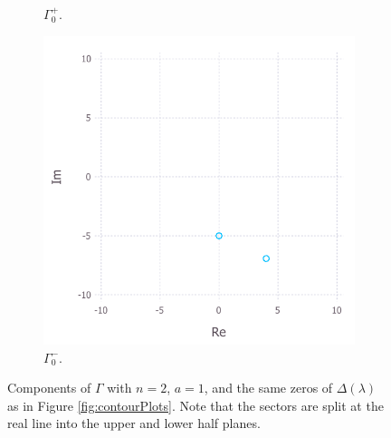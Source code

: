 \documentclass[12pt, oneside, a4paper]{article}
\begin{document}
\begin{figure}
\begin{subfigure}{.5\textwidth}
        \caption{$\Gamma_0^+$.}
    \end{subfigure}
    \begin{subfigure}{.5\textwidth}
        \centering
        \includegraphics[width=1\linewidth]{contourPlot_n=2_a=1_gamma0Minus_cropped.pdf}
        \caption{$\Gamma_0^-$.}
    \end{subfigure}
    \caption{Components of $\Gamma$ with $n=2$, $a=1$, and the same zeros of $\Delta(\lambda)$ as in Figure \ref{fig:contourPlots}. Note that the sectors are split at the real line into the upper and lower half planes.}
    \label{fig:contourPlot_n=2}
\end{figure}

\end{document}
